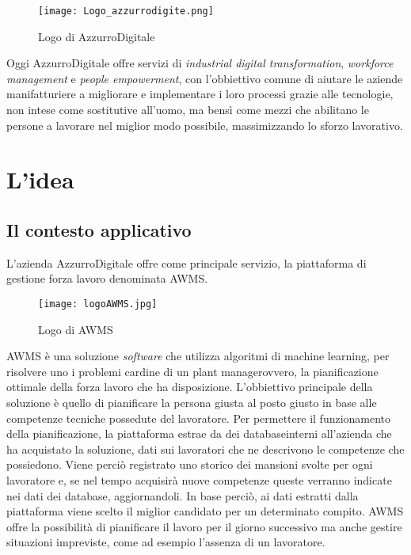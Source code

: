 \begin{figure}[h]
	\begin{center}
		\texttt{[image: Logo\_azzurrodigite.png]}
			\caption{Logo di AzzurroDigitale}
	\end{center}
\end{figure}
\pagebreak

Oggi AzzurroDigitale offre servizi di \emph{industrial digital transformation}, \emph{workforce management} e \emph{people empowerment}, con l'obbiettivo comune di aiutare le aziende manifatturiere a migliorare e implementare i loro processi grazie alle tecnologie, non intese come sostitutive all’uomo, ma bensì come mezzi che abilitano le persone a lavorare nel miglior modo possibile, massimizzando lo sforzo lavorativo.\\

\section{L'idea}

\subsection{Il contesto applicativo}
L'azienda AzzurroDigitale offre come principale servizio, la piattaforma di gestione forza lavoro denominata \gls{AWMS}.\\
	\begin{figure}[!h] 
		\begin{center}
			\texttt{[image: logoAWMS.jpg]}
			\caption{Logo di AWMS}
		\end{center}
	\end{figure}

\gls{AWMS} è una soluzione \emph{software} che utilizza algoritmi di \gls{machine learning}\glsfirstoccur, per risolvere uno i problemi cardine di un \gls{plant manager}\glsfirstoccur ovvero, la pianificazione ottimale della forza lavoro che ha disposizione. L'obbiettivo principale della soluzione è quello di pianificare la persona giusta al posto giusto in base alle competenze tecniche possedute del lavoratore. Per permettere il funzionamento della pianificazione, la piattaforma estrae da dei \gls{database}\glsfirstoccur interni all'azienda che ha acquistato la soluzione, dati sui lavoratori che ne descrivono le competenze che possiedono. Viene perciò registrato uno storico dei mansioni svolte per ogni lavoratore e, se nel tempo acquisirà nuove competenze queste verranno indicate nei dati dei \gls{database}\ap{[g]}, aggiornandoli. In base perciò, ai dati estratti dalla piattaforma viene scelto il miglior candidato per un determinato compito. \gls{AWMS} offre la possibilità di pianificare il lavoro per il giorno successivo ma anche gestire situazioni impreviste, come ad esempio l'assenza di un lavoratore.

